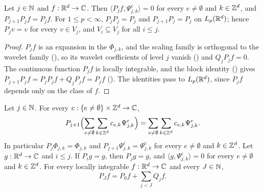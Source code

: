 \begin{proposition}
\label{prop:daub-rd-nested}
\leanok
{}
Let $j \in \mathbb{N}$ and $f : \mathbb{R}^d \to \mathbb{C}$. Then $\langle P_j f, \Psi^e_{j,k} \rangle = 0$ for every
$e \neq \emptyset$ and $k \in \mathbb{Z}^d$, and $P_{j+1} P_j f = P_j f$. For $1 \leq p < \infty$,
$P_j P_j = P_j$ and $P_{j+1} P_j = P_j$ on $L_p(\mathbb{R}^d)$; hence $P_j v = v$ for every $v \in V_j$,
and $V_i \subseteq V_j$ for all $i \leq j$.
\end{proposition}

\begin{proof}
\leanok
{}
$P_j f$ is an expansion in the $\Phi_{j,k}$, and the scaling family is orthogonal to the wavelet
family (), so its wavelet coefficients of level $j$ vanish
() and $Q_j P_j f = 0$. The continuous function $P_j f$ is
locally integrable, and the block identity () gives
$P_{j+1} P_j f = P_j P_j f + Q_j P_j f = P_j f$ (). The identities
pass to $L_p(\mathbb{R}^d)$, since $P_j f$ depends only on the class of $f$.
\end{proof}

\begin{lemma}
\label{lem:daub-rd-levels}
\leanok
{}
Let $j \in \mathbb{N}$. For every $c : \{e \neq \emptyset\} \times \mathbb{Z}^d \to \mathbb{C}$,
\[
  P_{j+1} \Bigl(\sum_{e \neq \emptyset} \sum_{k \in \mathbb{Z}^d} c_{e,k} \Psi^e_{j,k}\Bigr)
  = \sum_{e \neq \emptyset} \sum_{k \in \mathbb{Z}^d} c_{e,k} \Psi^e_{j,k} .
\]
In particular $P_j \Phi_{j,k} = \Phi_{j,k}$ and $P_{j+1} \Psi^e_{j,k} = \Psi^e_{j,k}$ for every
$e \neq \emptyset$ and $k \in \mathbb{Z}^d$. Let $g : \mathbb{R}^d \to \mathbb{C}$ and $i \leq j$. If $P_i g = g$, then
$P_j g = g$, and $\langle g, \Psi^e_{j,k} \rangle = 0$ for every $e \neq \emptyset$ and
$k \in \mathbb{Z}^d$. For every
locally integrable $f : \mathbb{R}^d \to \mathbb{C}$ and every $J \in \mathbb{N}$,
\[
  P_J f = P_0 f + \sum_{j < J} Q_j f .
\]
\end{lemma}

